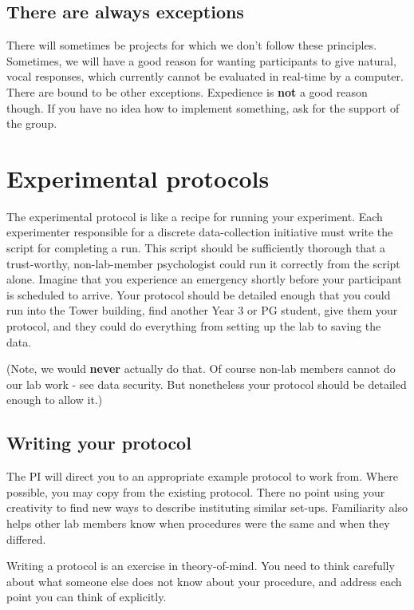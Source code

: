 \documentclass[12pt,]{book}
\theoremstyle{definition}
\theoremstyle{definition}
\theoremstyle{definition}
\theoremstyle{remark}
\begin{document}
\section{There are always exceptions}\label{there-are-always-exceptions}

There will sometimes be projects for which we don't follow these
principles. Sometimes, we will have a good reason for wanting
participants to give natural, vocal responses, which currently cannot be
evaluated in real-time by a computer. There are bound to be other
exceptions. Expedience is \textbf{not} a good reason though. If you have
no idea how to implement something, ask for the support of the group.

\chapter{Experimental protocols}\label{experimental-protocols}

The experimental protocol is like a recipe for running your experiment.
Each experimenter responsible for a discrete data-collection initiative
must write the script for completing a run. This script should be
sufficiently thorough that a trust-worthy, non-lab-member psychologist
could run it correctly from the script alone. Imagine that you
experience an emergency shortly before your participant is scheduled to
arrive. Your protocol should be detailed enough that you could run into
the Tower building, find another Year 3 or PG student, give them your
protocol, and they could do everything from setting up the lab to saving
the data.

(Note, we would \textbf{never} actually do that. Of course non-lab
members cannot do our lab work - see data security. But nonetheless your
protocol should be detailed enough to allow it.)

\section{Writing your protocol}\label{writing-your-protocol}

The PI will direct you to an appropriate example protocol to work from.
Where possible, you may copy from the existing protocol. There no point
using your creativity to find new ways to describe instituting similar
set-ups. Familiarity also helps other lab members know when procedures
were the same and when they differed.

Writing a protocol is an exercise in theory-of-mind. You need to think
carefully about what someone else does not know about your procedure,
and address each point you can think of explicitly.
\end{document}
